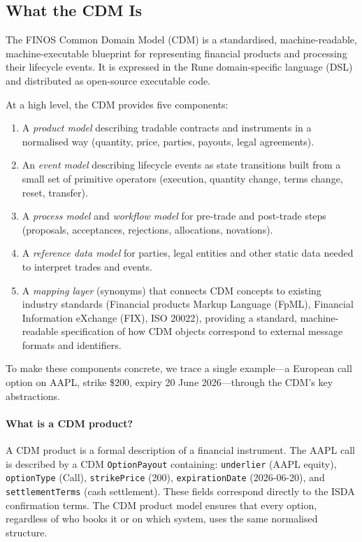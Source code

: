 \documentclass[11pt,a4paper]{article}
\begin{document}
\subsection{What the CDM Is}

The FINOS Common Domain Model (CDM) is a standardised, machine-readable, machine-executable blueprint for representing financial products and processing their lifecycle events. It is expressed in the Rune domain-specific language (DSL) and distributed as open-source executable code.

At a high level, the CDM provides five components:

\begin{enumerate}
\item A \textit{product model} describing tradable contracts and instruments in a normalised way (quantity, price, parties, payouts, legal agreements).
\item An \textit{event model} describing lifecycle events as state transitions built from a small set of primitive operators (execution, quantity change, terms change, reset, transfer).
\item A \textit{process model} and \textit{workflow model} for pre-trade and post-trade steps (proposals, acceptances, rejections, allocations, novations).
\item A \textit{reference data model} for parties, legal entities and other static data needed to interpret trades and events.
\item A \textit{mapping layer} (synonyms) that connects CDM concepts to existing industry standards (Financial products Markup Language (FpML), Financial Information eXchange (FIX), ISO 20022), providing a standard, machine-readable specification of how CDM objects correspond to external message formats and identifiers.
\end{enumerate}

To make these components concrete, we trace a single example---a European call option on AAPL, strike \$200, expiry 20 June 2026---through the CDM's key abstractions.

\paragraph{What is a CDM product?}
A CDM product is a formal description of a financial instrument. The AAPL call is described by a CDM \texttt{OptionPayout} containing: \texttt{underlier} (AAPL equity), \texttt{optionType} (Call), \texttt{strikePrice} (200), \texttt{expirationDate} (2026-06-20), and \texttt{settlementTerms} (cash settlement). These fields correspond directly to the ISDA confirmation terms. The CDM product model ensures that every option, regardless of who books it or on which system, uses the same normalised structure.
\end{document}
